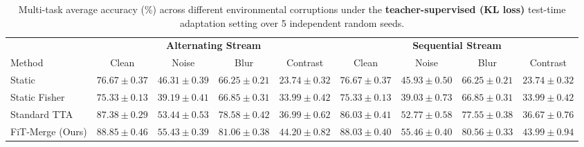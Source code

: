 \begin{table}[t]
\caption{Multi-task average accuracy (\%) across different environmental corruptions under the \textbf{teacher-supervised (KL loss)} test-time adaptation setting over 5 independent random seeds.}
\label{tab:results_supervised}
\vskip 0.05in
\begin{center}
\begin{scriptsize}
\begin{sc}
\setlength{\tabcolsep}{2.5pt}
\begin{tabular}{lcccccccc}
\toprule
& \multicolumn{4}{c}{\textbf{Alternating Stream}} & \multicolumn{4}{c}{\textbf{Sequential Stream}} \\
\cmidrule(r){2-5} \cmidrule(l){6-9}
Method & Clean & Noise & Blur & Contrast & Clean & Noise & Blur & Contrast \\
\midrule
Static & $76.67 \pm 0.37$ & $46.31 \pm 0.39$ & $66.25 \pm 0.21$ & $23.74 \pm 0.32$ & $76.67 \pm 0.37$ & $45.93 \pm 0.50$ & $66.25 \pm 0.21$ & $23.74 \pm 0.32$ \\
Static Fisher & $75.33 \pm 0.13$ & $39.19 \pm 0.41$ & $66.85 \pm 0.31$ & $33.99 \pm 0.42$ & $75.33 \pm 0.13$ & $39.03 \pm 0.73$ & $66.85 \pm 0.31$ & $33.99 \pm 0.42$ \\
Standard TTA & $87.38 \pm 0.29$ & $53.44 \pm 0.53$ & $78.58 \pm 0.42$ & $36.99 \pm 0.62$ & $86.03 \pm 0.41$ & $52.77 \pm 0.58$ & $77.55 \pm 0.38$ & $36.67 \pm 0.76$ \\
FiT-Merge (Ours) & $\mathbf{88.85 \pm 0.46}$ & $\mathbf{55.43 \pm 0.39}$ & $\mathbf{81.06 \pm 0.38}$ & $\mathbf{44.20 \pm 0.82}$ & $\mathbf{88.03 \pm 0.40}$ & $\mathbf{55.46 \pm 0.40}$ & $\mathbf{80.56 \pm 0.33}$ & $\mathbf{43.99 \pm 0.94}$ \\
\bottomrule
\end{tabular}
\end{sc}
\end{scriptsize}
\end{center}
\vskip -0.15in
\end{table}
